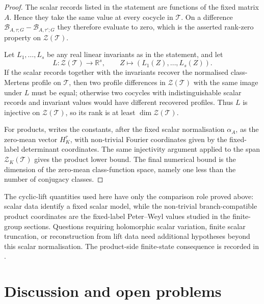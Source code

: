 \documentclass[11pt,a4paper]{amsart}
\theoremstyle{plain}
\theoremstyle{definition}
\theoremstyle{remark}
\begin{document}
\begin{proof}
  The scalar records listed in the statement are functions of the fixed matrix
  \(A\).  Hence they take the same value at every cocycle in \(\mathscr T\).
  On a difference
  \(\mathcal B_{A,\tau;G}-\mathcal B_{A,\tau';G}\) they therefore evaluate to
  zero, which is the asserted rank-zero property on
  \(\mathcal Z(\mathscr T)\).

  Let \(L_1,\dots,L_s\) be any real linear invariants as in the statement,
  and let
  \[
    L:\mathcal Z(\mathscr T)\longrightarrow\mathbb R^s,
    \qquad Z\longmapsto(L_1(Z),\dots,L_s(Z)).
  \]
  If the scalar records together with the invariants recover the normalised
  class-Mertens profile on \(\mathscr T\), then two profile differences in
  \(\mathcal Z(\mathscr T)\) with the same image under \(L\) must be equal;
  otherwise two cocycles with indistinguishable scalar records and invariant
  values would have different recovered profiles.  Thus \(L\) is injective on
  \(\mathcal Z(\mathscr T)\), so its rank is at least
  \(\dim\mathcal Z(\mathscr T)\).

  For products,  writes the
  constants, after the fixed scalar normalisation \(\alpha_A\), as the
  zero-mean vector \(H_K^\tau\), with non-trivial Fourier coordinates given by
  the fixed-label determinant coordinates.  The same injectivity argument
  applied to the span \(\mathcal Z_K(\mathscr T)\) gives the product lower
  bound.  The final numerical bound is the dimension of the zero-mean
  class-function space, namely one less than the number of conjugacy classes.
\end{proof}

\noindent
  The cyclic-lift quantities used here have only the comparison role proved
  above: scalar data identify a fixed scalar model, while the non-trivial
  branch-compatible product coordinates are the fixed-label Peter--Weyl values
  studied in the finite-group sections.  Questions requiring holomorphic scalar
  variation, finite scalar truncation, or reconstruction from lift data need
  additional hypotheses beyond this scalar normalisation.  The product-side
  finite-state consequence is recorded in
  .

\section{Discussion and open problems}\label{sec:conclusion}
\end{document}
